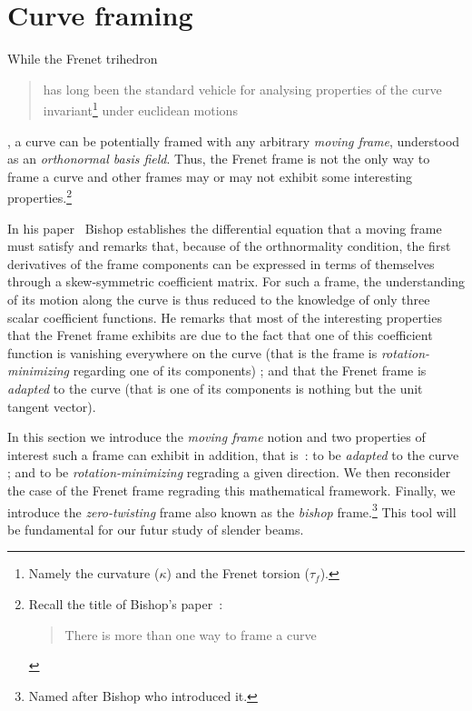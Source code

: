 
\section{Curve framing}


While the Frenet trihedron \blockcquote[p.1]{Bishop1975}{has long been the standard vehicle for analysing properties of the curve invariant\footnote{Namely the curvature ($\kappa$) and the Frenet torsion ($\tau_f$).} under euclidean motions}, a curve can be potentially framed with any arbitrary \emph{moving frame}, understood as an \emph{orthonormal basis field}. Thus, the Frenet frame is not the only way to frame a curve and other frames may or may not exhibit some interesting properties.\footnote{Recall the title of Bishop's paper~: \blockcquote[]{Bishop1975}{There is more than one way to frame a curve}.} 

In his paper~\cite{Bishop1975} Bishop establishes the differential equation that a moving frame must satisfy and remarks that, because of the orthnormality condition, the first derivatives of the frame components can be expressed in terms of themselves through a skew-symmetric coefficient matrix. For such a frame, the understanding of its motion along the curve is thus reduced to the knowledge of only three scalar coefficient functions. He remarks that most of the interesting properties that the Frenet frame exhibits are due to the fact that one of this coefficient function is vanishing everywhere on the curve (that is the frame is \emph{rotation-minimizing} regarding one of its components) ; and that the Frenet frame is \emph{adapted} to the curve (that is one of its components is nothing but the unit tangent vector).

In this section we introduce the \emph{moving frame} notion and two properties of interest such a frame can exhibit in addition, that is~: to be \emph{adapted} to the curve ; and to be \emph{rotation-minimizing} regrading a given direction. We then reconsider the case of the Frenet frame regrading this mathematical framework. Finally, we introduce the \emph{zero-twisting} frame also known as the \emph{bishop} frame.\footnote{Named after Bishop who introduced it.} This tool will be fundamental for our futur study of slender beams.

